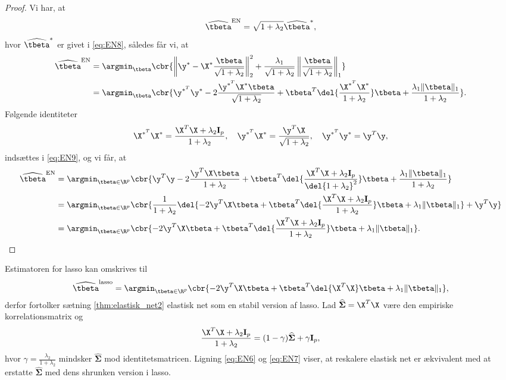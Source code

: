 \begin{proof}
Vi har, at
\begin{align*}
\widehat{\tbeta}^\text{EN} = \sqrt{1+\lambda_2} \widehat{\tbeta}^*,
\end{align*}
hvor \(\widehat{\tbeta}^*\) er givet i \eqref{eq:EN8}, således får vi, at
\begin{align}
\widehat{\tbeta}^\text{EN} &= \argmin_{\tbeta} \cbr{\left\Vert \y^* - \X^* \frac{\tbeta}{\sqrt{1+\lambda_2}} \right\Vert_2^2 + \frac{\lambda_1}{\sqrt{1+\lambda_2}} \left\Vert \frac{\tbeta}{\sqrt{1+\lambda_2}} \right\Vert_1} \nonumber \\
&=\argmin_{\tbeta} \cbr{ \y^{*^T} \y^* - 2 \frac{\y^{*^T} \X^* \tbeta}{\sqrt{1+\lambda_2}} + \tbeta^T \del{\frac{\X^{*^T} \X^*}{1+\lambda_2}} \tbeta + \frac{\lambda_1 \Vert \tbeta \Vert_1}{1+\lambda_2}}. \label{eq:EN9}
\end{align}
Følgende identiteter
\begin{align*}
\X^{*^T} \X^* = \frac{\X^T \X + \lambda_2 \mathbf{I}_p}{1+ \lambda_2}, \quad \y^{*^T} \X^* = \frac{\y^T \X}{\sqrt{1+\lambda_2}} , \quad \y^{*^T} \y^* = \y^T \y, 
\end{align*}
indsættes i \eqref{eq:EN9}, og vi får, at
\begin{align*}
\widehat{\tbeta}^\text{EN} &= \argmin_{\tbeta \in \R^p} \cbr{\y^T \y - 2 \frac{\y^T \X \tbeta}{1+\lambda_2} + \tbeta^T \del{\frac{\X^T \X + \lambda_2 \mathbf{I}_p}{\del{1+\lambda_2}^2}} \tbeta + \frac{\lambda_1 \Vert \tbeta \Vert_1}{1+\lambda_2}} \\ 
&= \argmin_{\tbeta \in \R^p} \cbr{\frac{1}{1+\lambda_2} \del{- 2 \y^T \X \tbeta + \tbeta^T \del{\frac{\X^T \X + \lambda_2 \mathbf{I}_p}{1+ \lambda_2}} \tbeta + \lambda_1 \Vert \tbeta \Vert_1} + \y^T \y} \\
&= \argmin_{\tbeta \in \R^p} \cbr{- 2 \y^T \X \tbeta + \tbeta^T \del{\frac{\X^T \X + \lambda_2 \mathbf{I}_p}{1+ \lambda_2}} \tbeta + \lambda_1 \Vert \tbeta \Vert_1}.
\end{align*}
\end{proof}
%
Estimatoren for lasso kan omskrives til
\begin{align}
\widehat{\tbeta}^\text{lasso} = \argmin_{\tbeta \in \R^p} \cbr{ - 2 \y^T \X \tbeta + \tbeta^T \del{\X^T \X} \tbeta  + \lambda_1 \Vert \tbeta \Vert_1}, \label{eq:EN7}
\end{align}
derfor fortolker sætning \ref{thm:elastisk_net2} elastisk net som en stabil version af lasso.
Lad \(\widehat{\boldsymbol{\Sigma}} = \X^T \X\) være den empiriske korrelationsmatrix og
\begin{align*}
\frac{\X^T \X + \lambda_2 \mathbf{I}_p}{1 + \lambda_2} = (1-\gamma) \widehat{\boldsymbol{\Sigma}} + \gamma \mathbf{I}_p,
\end{align*}
hvor \(\gamma=\frac{\lambda_2}{1+\lambda_2}\) mindsker \(\widehat{\boldsymbol{\Sigma}}\) mod identitetsmatricen.
Ligning \eqref{eq:EN6} og \eqref{eq:EN7} viser, at reskalere elastisk net er ækvivalent med at erstatte \(\widehat{\boldsymbol{\Sigma}}\) med dens shrunken version i lasso.

